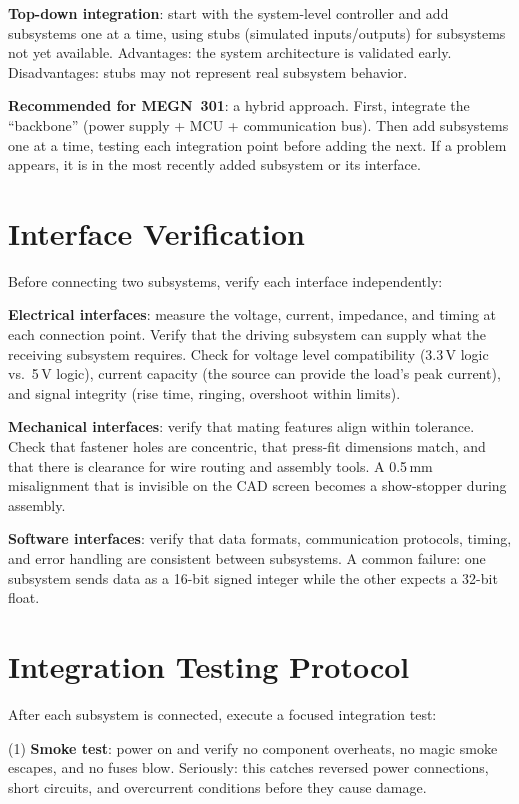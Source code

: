 \textbf{Top-down integration}: start with the system-level controller and add subsystems one at a time, using stubs (simulated inputs/outputs) for subsystems not yet available. Advantages: the system architecture is validated early. Disadvantages: stubs may not represent real subsystem behavior.

\textbf{Recommended for MEGN~301}: a hybrid approach. First, integrate the ``backbone'' (power supply + MCU + communication bus). Then add subsystems one at a time, testing each integration point before adding the next. If a problem appears, it is in the most recently added subsystem or its interface.

\section{Interface Verification}
Before connecting two subsystems, verify each interface independently:

\textbf{Electrical interfaces}: measure the voltage, current, impedance, and timing at each connection point. Verify that the driving subsystem can supply what the receiving subsystem requires. Check for voltage level compatibility (3.3\,V logic vs.\ 5\,V logic), current capacity (the source can provide the load's peak current), and signal integrity (rise time, ringing, overshoot within limits).

\textbf{Mechanical interfaces}: verify that mating features align within tolerance. Check that fastener holes are concentric, that press-fit dimensions match, and that there is clearance for wire routing and assembly tools. A 0.5\,mm misalignment that is invisible on the CAD screen becomes a show-stopper during assembly.

\textbf{Software interfaces}: verify that data formats, communication protocols, timing, and error handling are consistent between subsystems. A common failure: one subsystem sends data as a 16-bit signed integer while the other expects a 32-bit float.

\section{Integration Testing Protocol}
After each subsystem is connected, execute a focused integration test:

(1) \textbf{Smoke test}: power on and verify no component overheats, no magic smoke escapes, and no fuses blow. Seriously: this catches reversed power connections, short circuits, and overcurrent conditions before they cause damage.


